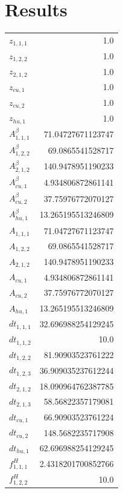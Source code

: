 \documentclass{article}%
\makeatletter
\let\mcnewpage=\newpage%
\newcommand{\TrickSupertabularIntoMulticols}{%
\renewcommand\newpage{%
\if@firstcolumn%
\hrule width\linewidth height0pt%
\columnbreak%
\else%
\mcnewpage%
\fi%
}%
}%
\makeatother
\begin{document}
\section{Results}%
\thispagestyle{plain}%
\begin{multicols*}{3}%
\TrickSupertabularIntoMulticols%
%
\begin{supertabular}{lr}%
	$z_{1,1,1}$ & 1.0 \\%
	$z_{1,2,2}$ & 1.0 \\%
	$z_{2,1,2}$ & 1.0 \\%
	$z_{cu,1}$ & 1.0 \\%
	$z_{cu,2}$ & 1.0 \\%
	$z_{hu,1}$ & 1.0 \\%
	$A_{1,1,1}^{\beta}$ & 71.04727671123747 \\%
	$A_{1,2,2}^{\beta}$ & 69.0865541528717 \\%
	$A_{2,1,2}^{\beta}$ & 140.9478951190233 \\%
	$A_{cu,1}^{\beta}$ & 4.934806872861141 \\%
	$A_{cu,2}^{\beta}$ & 37.75976772070127 \\%
	$A_{hu,1}^{\beta}$ & 13.265195513246809 \\%
	$A_{1,1,1}$ & 71.04727671123747 \\%
	$A_{1,2,2}$ & 69.0865541528717 \\%
	$A_{2,1,2}$ & 140.9478951190233 \\%
	$A_{cu,1}$ & 4.934806872861141 \\%
	$A_{cu,2}$ & 37.75976772070127 \\%
	$A_{hu,1}$ & 13.265195513246809 \\%
	$dt_{1,1,1}$ & 32.696988254129245 \\%
	$dt_{1,1,2}$ & 10.0 \\%
	$dt_{1,2,2}$ & 81.90903523761222 \\%
	$dt_{1,2,3}$ & 36.909035237612244 \\%
	$dt_{2,1,2}$ & 18.090964762387785 \\%
	$dt_{2,1,3}$ & 58.56822357179081 \\%
	$dt_{cu,1}$ & 66.90903523761224 \\%
	$dt_{cu,2}$ & 148.5682235717908 \\%
	$dt_{hu,1}$ & 62.696988254129245 \\%
	$f_{1,1,1}^{H}$ & 2.4318201700852766 \\%
	$f_{1,2,2}^{H}$ & 10.0 \\%

\end{supertabular}
\end{multicols*}
\end{document}
